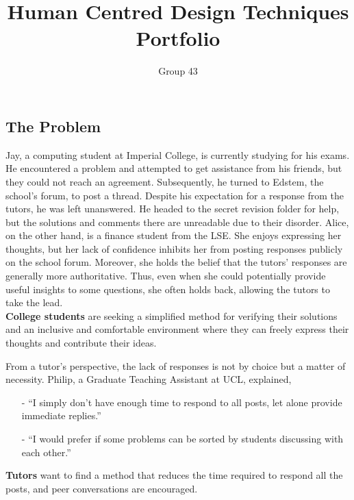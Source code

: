 \documentclass[a4paper]{article}
\begin{document}
    \title{
        \vspace{-3em}
        Human Centred Design Techniques Portfolio}
    \author{
        Group 43
    }
    \date{\vspace{-2em}}
    \maketitle

    \subsection*{The Problem}

    \noindent Jay, a computing student at Imperial College, is currently studying for his exams.
    He encountered a problem and attempted to get assistance from his friends, but they could not reach an agreement.
    Subsequently, he turned to Edstem, the school’s forum, to post a thread.
    Despite his expectation for a response from the tutors, he was left unanswered.
    He headed to the secret revision folder for help, but the solutions and comments there are unreadable due to their disorder.
    Alice, on the other hand, is a finance student from the LSE. She enjoys expressing her thoughts, but her lack of confidence inhibits her from posting responses publicly on the school forum.
    Moreover, she holds the belief that the tutors' responses are generally more authoritative.
    Thus, even when she could potentially provide useful insights to some questions, she often holds back, allowing the tutors to take the lead.\\
    \textbf{College students} are seeking a simplified method for verifying their solutions and an inclusive and comfortable environment where they can freely express their thoughts and contribute their ideas.

    From a tutor's perspective, the lack of responses is not by choice but a matter of necessity.
    Philip, a Graduate Teaching Assistant at UCL, explained,
    \begin{itemize}
        \item[-] ``I simply don't have enough time to respond to all posts, let alone provide immediate replies.''
        \item[-] ``I would prefer if some problems can be sorted by students discussing with each other.''
    \end{itemize}
    \textbf{Tutors} want to find a method that reduces the time required to respond all the posts, and peer conversations are encouraged.
\end{document}
